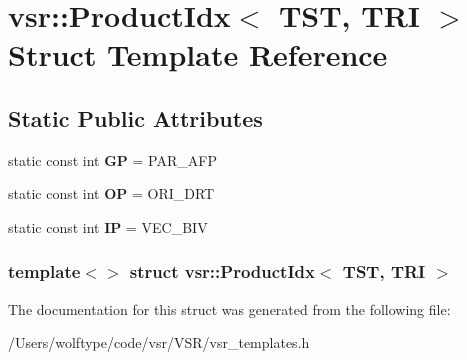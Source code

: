 \hypertarget{structvsr_1_1_product_idx_3_01_t_s_t_00_01_t_r_i_01_4}{\section{vsr\-:\-:Product\-Idx$<$ T\-S\-T, T\-R\-I $>$ Struct Template Reference}
\label{structvsr_1_1_product_idx_3_01_t_s_t_00_01_t_r_i_01_4}
}
\subsection*{Static Public Attributes}
\begin{DoxyCompactItemize}
\item 
\hypertarget{structvsr_1_1_product_idx_3_01_t_s_t_00_01_t_r_i_01_4_a80230f3fc011964c5d319c1b1d8b0f6a}{static const int {\bfseries G\-P} = P\-A\-R\-\_\-\-A\-F\-P}\label{structvsr_1_1_product_idx_3_01_t_s_t_00_01_t_r_i_01_4_a80230f3fc011964c5d319c1b1d8b0f6a}

\item 
\hypertarget{structvsr_1_1_product_idx_3_01_t_s_t_00_01_t_r_i_01_4_a862dce2951df34149920cffdee4625ec}{static const int {\bfseries O\-P} = O\-R\-I\-\_\-\-D\-R\-T}\label{structvsr_1_1_product_idx_3_01_t_s_t_00_01_t_r_i_01_4_a862dce2951df34149920cffdee4625ec}

\item 
\hypertarget{structvsr_1_1_product_idx_3_01_t_s_t_00_01_t_r_i_01_4_a223449cbae4a49dde7d4265a7b0de282}{static const int {\bfseries I\-P} = V\-E\-C\-\_\-\-B\-I\-V}\label{structvsr_1_1_product_idx_3_01_t_s_t_00_01_t_r_i_01_4_a223449cbae4a49dde7d4265a7b0de282}

\end{DoxyCompactItemize}
\subsubsection*{template$<$$>$ struct vsr\-::\-Product\-Idx$<$ T\-S\-T, T\-R\-I $>$}



The documentation for this struct was generated from the following file\-:\begin{DoxyCompactItemize}
\item 
/\-Users/wolftype/code/vsr/\-V\-S\-R/vsr\-\_\-templates.\-h\end{DoxyCompactItemize}

